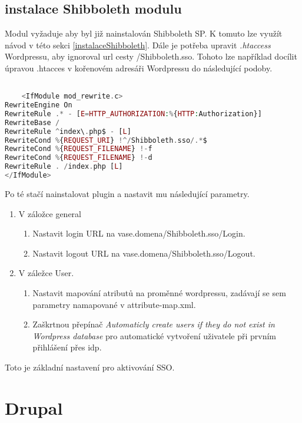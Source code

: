 \subsection{instalace Shibboleth modulu} %
Modul vyžaduje aby byl již nainstalován Shibboleth SP. K tomuto lze využít návod v této sekci \ref{instalaceShibboleth}. Dále je potřeba upravit \emph{.htaccess} Wordpressu, aby ignoroval url cesty /Shibboleth.sso. Tohoto lze například docílit úpravou .htacces v kořenovém adresáři Wordpressu do následující podoby.

\begin{lstlisting}[language=php]

    <IfModule mod_rewrite.c>
RewriteEngine On
RewriteRule .* - [E=HTTP_AUTHORIZATION:%{HTTP:Authorization}]
RewriteBase /
RewriteRule ^index\.php$ - [L]
RewriteCond %{REQUEST_URI} !^/Shibboleth.sso/.*$
RewriteCond %{REQUEST_FILENAME} !-f
RewriteCond %{REQUEST_FILENAME} !-d
RewriteRule . /index.php [L]
</IfModule>


\end{lstlisting}

Po té stačí nainstalovat plugin a nastavit mu následující parametry.

\begin{enumerate}
    \item V záložce general
    \begin{enumerate}
        \item Nastavit login URL na vase.domena/Shibboleth.sso/Login.
        \item Nastavit logout URL na vase.domena/Shibboleth.sso/Logout.
    \end{enumerate}
    \item V záležce User.
     \begin{enumerate}
        \item Nastavit mapování atributů na proměnné wordpressu, zadávají se sem parametry namapované v attribute-map.xml.
        \item Zaškrtnou přepínač \emph{Automaticly create users if they do not exist in Wordpress database} pro automatické vytvoření uživatele při prvním přihlášení přes idp.
     \end{enumerate}
\end{enumerate}

Toto je základní nastavení pro aktivování SSO.

\section{Drupal} %

